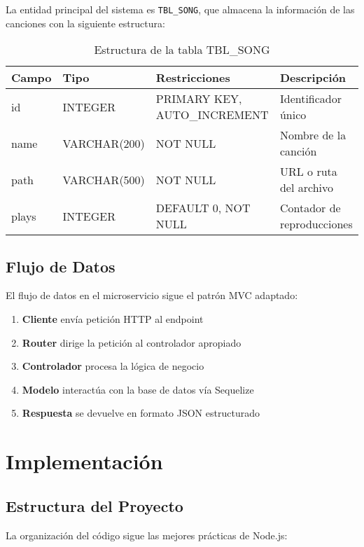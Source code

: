 \documentclass[12pt,a4paper]{article}
\begin{document}
La entidad principal del sistema es \texttt{TBL\_SONG}, que almacena la información de las canciones con la siguiente estructura:

\begin{table}[H]
\centering
\caption{Estructura de la tabla TBL\_SONG}
\begin{tabular}{@{}lllp{4cm}@{}}
\toprule
\textbf{Campo} & \textbf{Tipo} & \textbf{Restricciones} & \textbf{Descripción} \\
\midrule
id & INTEGER & PRIMARY KEY, AUTO\_INCREMENT & Identificador único \\
name & VARCHAR(200) & NOT NULL & Nombre de la canción \\
path & VARCHAR(500) & NOT NULL & URL o ruta del archivo \\
plays & INTEGER & DEFAULT 0, NOT NULL & Contador de reproducciones \\
\bottomrule
\end{tabular}
\end{table}

\subsection{Flujo de Datos}

El flujo de datos en el microservicio sigue el patrón MVC adaptado:

\begin{enumerate}
    \item \textbf{Cliente} envía petición HTTP al endpoint
    \item \textbf{Router} dirige la petición al controlador apropiado
    \item \textbf{Controlador} procesa la lógica de negocio
    \item \textbf{Modelo} interactúa con la base de datos vía Sequelize
    \item \textbf{Respuesta} se devuelve en formato JSON estructurado
\end{enumerate}

\section{Implementación}

\subsection{Estructura del Proyecto}

La organización del código sigue las mejores prácticas de Node.js:
\end{document}
